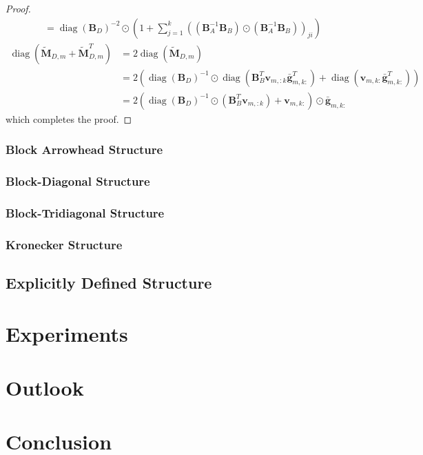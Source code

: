 \documentclass[a4paper, 11pt, oneside]{scrartcl}
\theoremstyle{break}
\DeclareMathOperator{\diag}{diag}
\newcommand{\matr}[1]{\boldsymbol{#1}}
\numberwithin{equation}{section}
\begin{document}
\begin{proof}
\begin{align*}
							&= \diag(\matr{B}_D)^{-2} \odot \left(1 + \sum_{j=1}^k ((\matr{B}_A^{-1} \matr{B}_B) \odot (\matr{B}_A^{-1} \matr{B}_B))_{ji} \right)
						\end{align*}
						\begin{align*}
							\diag(\matr{\tilde{M}}_{D, m} + \matr{\tilde{M}}_{D, m}^T) &= 2 \diag(\matr{\tilde{M}}_{D, m}) \\
							&= 2 (\diag(\matr{B}_D)^{-1} \odot \diag(\matr{B}_B^T \matr{v}_{m, :k} \matr{\bar{g}}_{m, k:}^T) + \diag(\matr{v}_{m, k:} \matr{\bar{g}}_{m, k:}^T)) \\
							&= 2 (\diag(\matr{B}_D)^{-1} \odot (\matr{B}_B^T \matr{v}_{m, :k}) + \matr{v}_{m, k:}) \odot \matr{\bar{g}}_{m, k:}
						\end{align*}
						which completes the proof.
					\end{proof}

			\subsubsection{Block Arrowhead Structure}
			\subsubsection{Block-Diagonal Structure}
			\subsubsection{Block-Tridiagonal Structure}
			\subsubsection{Kronecker Structure}
		\subsection{Explicitly Defined Structure}

	\section{Experiments}

	\section{Outlook}

	\section{Conclusion}

	\newpage
	\printbibliography
\end{document}
